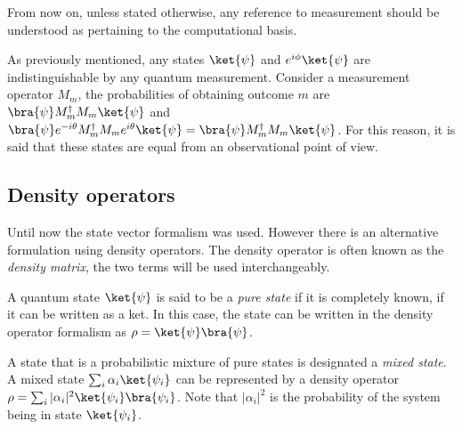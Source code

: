 From now on, unless stated otherwise, any reference to measurement should be understood as pertaining to the computational basis.

As previously mentioned, any states $\ket{\psi}$ and $e^{i\phi}\ket{\psi}$ are indistinguishable by any quantum measurement. Consider a measurement operator $M_m$, the probabilities of obtaining outcome $m$ are $\bra{\psi} M_{m}^{\dagger}M_{m}\ket{\psi}$ and $\bra{\psi} e^{-i \theta} M_{m}^{\dagger}M_{m}e^{i\theta}\ket{\psi}=\bra{\psi} M_{m}^{\dagger}M_{m}\ket{\psi}$. For this reason, it is said that these states are equal from an observational point of view.




\subsection{Density operators}
Until now the state vector formalism was used. However there is an alternative formulation using density operators. The density operator is often known as the \emph{density matrix}, the two terms will be used interchangeably.


\begin{definition}
A quantum state $\ket{\psi}$ is said to be a \emph{pure state} if it is completely known, \ie if it can be written as a ket. In this case, the state can be written in the density operator formalism as $\rho = \ket{\psi}\bra{\psi}$. 
\end{definition}

\begin{definition}
A state that is a probabilistic mixture of pure states is designated a \emph{mixed state}. A mixed state $\sum_i \alpha_i \ket{\psi_i}$ can be represented by a density operator $\rho= \sum_i |\alpha_i|^{2}\ket{\psi_i}\bra{\psi_i}$. Note that $|\alpha_i|^{2}$ is the probability of the system being in state $\ket{\psi_i}$.
\end{definition} 

